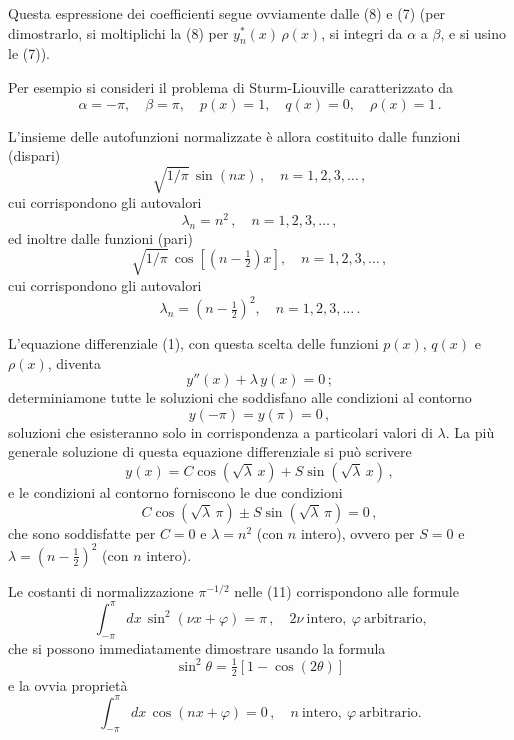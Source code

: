 \documentclass[11pt, a4paper]{book}
\numberwithin{equation}{section}
\begin{document}
Questa espressione dei coefficienti segue ovviamente dalle (8) e (7) (per dimostrarlo, si moltiplichi la (8) per $y_n^*(x)\,\rho(x)$, si integri da $\alpha$ a $\beta$, e si usino le (7)).

Per esempio si consideri il problema di Sturm-Liouville caratterizzato da
\begin{equation}
\alpha=-\pi,\quad\beta=\pi,\quad p(x)=1,\quad q(x)=0,\quad\rho(x)=1\,. \tag{10}
\end{equation}

L'insieme delle autofunzioni normalizzate è allora costituito dalle funzioni (dispari)
\begin{equation}
\sqrt{1/\pi}\,\sin(nx)\,,\quad n=1,2,3,\ldots\,, \tag{11a}
\end{equation}
cui corrispondono gli autovalori
\begin{equation}
\lambda_n=n^2\,,\quad n=1,2,3,\ldots\,, \tag{12a}
\end{equation}
ed inoltre dalle funzioni (pari)
\begin{equation}
\sqrt{1/\pi}\,\cos\!\left[\left(n-\tfrac{1}{2}\right)x\right],\quad n=1,2,3,\ldots\,, \tag{11b}
\end{equation}
cui corrispondono gli autovalori
\begin{equation}
\lambda_n=\left(n-\tfrac{1}{2}\right)^2,\quad n=1,2,3,\ldots\,. \tag{12b}
\end{equation}

L'equazione differenziale (1), con questa scelta delle funzioni $p(x)$, $q(x)$ e $\rho(x)$, diventa
\[
y''(x)+\lambda\,y(x)=0\,;
\]
determiniamone tutte le soluzioni che soddisfano alle condizioni al contorno
\[
y(-\pi)=y(\pi)=0\,,
\]
soluzioni che esisteranno solo in corrispondenza a particolari valori di $\lambda$. La più generale soluzione di questa equazione differenziale si può scrivere
\[
y(x)=C\cos(\sqrt{\lambda}\,x)+S\sin(\sqrt{\lambda}\,x)\,,
\]
e le condizioni al contorno forniscono le due condizioni
\[
C\cos(\sqrt{\lambda}\,\pi)\pm S\sin(\sqrt{\lambda}\,\pi)=0\,,
\]
che sono soddisfatte per $C=0$ e $\lambda=n^2$ (con $n$ intero), ovvero per $S=0$ e $\lambda=(n-\tfrac{1}{2})^2$ (con $n$ intero).

Le costanti di normalizzazione $\pi^{-1/2}$ nelle (11) corrispondono alle formule
\[
\int_{-\pi}^{\pi}dx\,\sin^2(\nu x+\varphi)=\pi\,,\quad 2\nu\ \text{intero},\ \varphi\ \text{arbitrario,}
\]
che si possono immediatamente dimostrare usando la formula
\[
\sin^2\theta=\tfrac{1}{2}\left[1-\cos(2\theta)\right]
\]
e la ovvia proprietà
\[
\int_{-\pi}^{\pi}dx\,\cos(nx+\varphi)=0\,,\quad n\ \text{intero},\ \varphi\ \text{arbitrario.}
\]
\end{document}
